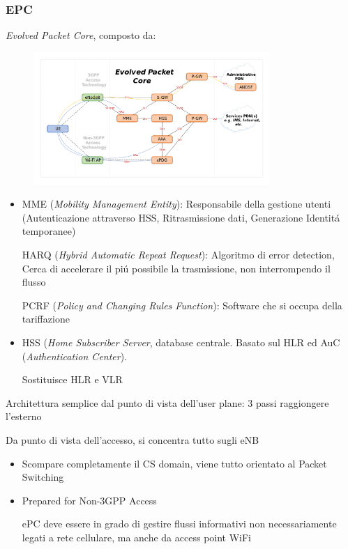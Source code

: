 \documentclass{article}
\begin{document}
\subsubsection{EPC}
\textit{Evolved Packet Core}, composto da:
\begin{figure}[h]
    \includegraphics[width=0.8\textwidth]{img/sdt/Evolved_Packet_Core}
    \centering
\end{figure}

\begin{itemize}
    \item MME (\textit{Mobility Management Entity}): Responsabile della gestione utenti (Autenticazione attraverso HSS, Ritrasmissione dati, Generazione Identit\'a temporanee)

        HARQ (\textit{Hybrid Automatic Repeat Request}): Algoritmo di error detection, Cerca di accelerare il pi\'u possibile la trasmissione, non interrompendo il flusso

        PCRF (\textit{Policy and Changing Rules Function}): Software che si occupa della tariffazione
    \item HSS (\textit{Home Subscriber Server}, database centrale. Basato sul HLR ed AuC (\textit{Authentication Center}).

        Sostituisce HLR e VLR

\end{itemize}


Architettura semplice dal punto di vista dell'user plane: 3 passi raggiongere l'esterno

Da punto di vista dell'accesso, si concentra tutto sugli eNB


\begin{itemize}
    \item Scompare completamente il CS domain, viene tutto orientato al Packet Switching

    \item  Prepared for Non-3GPP Access

        ePC deve essere in grado di gestire flussi informativi non necessariamente legati a rete cellulare,
        ma anche da access point WiFi
\end{itemize}
\end{document}
